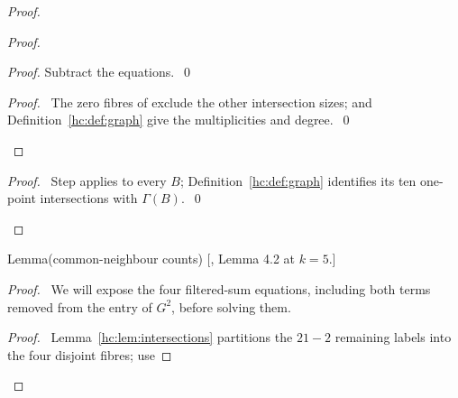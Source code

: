 \begin{mergedproofsection}
\begin{proof}
\begin{proof}
\begin{proof}
   Subtract the equations.~\qed\end{proof}
  \qedstep
  \begin{proof}\pf\ The zero fibres of 
   exclude the other intersection sizes; 
   and Definition~\ref{hc:def:graph} give the multiplicities and degree.~\qed\end{proof}
 \end{proof}
 \qedstep
 \begin{proof}\pf\ Step  applies to every $B$;
  Definition~\ref{hc:def:graph} identifies its ten one-point
  intersections with $\Gamma(B)$.~\qed\end{proof}
\end{proof}

\begin{namedresult}{Lemma}{(common-neighbour counts)}\label{hc:lem:common}
 \textup{[\cite{HC}, Lemma 4.2 at $k=5$.]}
 \leavevmode\par
\end{namedresult}
\begin{proof}
 \pfsketch\ We will expose the four filtered-sum equations, including
 both terms removed from the entry of $G^2$, before solving them.
 \begin{proof}\pf\ Lemma~\ref{hc:lem:intersections} partitions the
  $21-2$ remaining labels into the four disjoint fibres; use

\end{proof}
\end{proof}
\end{mergedproofsection}
